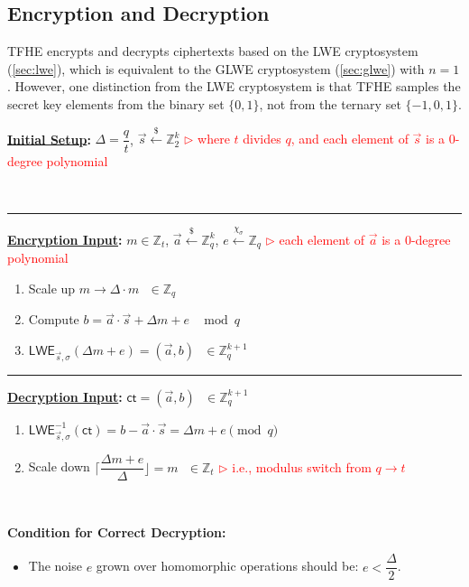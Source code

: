\clearpage

\subsection{Encryption and Decryption}
\label{subsec:tfhe-enc-dec}

TFHE encrypts and decrypts ciphertexts based on the LWE cryptosystem (\autoref{sec:lwe}), which is equivalent to the GLWE cryptosystem (\autoref{sec:glwe}) with $n = 1$. However, one distinction from the LWE cryptosystem is that TFHE samples the secret key elements from the binary set $\{0, 1\}$, not from the ternary set $\{-1, 0, 1\}$.


\begin{tcolorbox}[title={\textbf{\tboxlabel{\ref*{subsec:tfhe-enc-dec}} TFHE Encryption and Decryption}}]
\textbf{\underline{Initial Setup}:} $\Delta = \dfrac{q}{t}$, $\vec{s} \xleftarrow{\$} \mathbb{Z}_2^k$  \textcolor{red}{ $\rhd$ where $t$ divides $q$, and each element of $\vec{s}$ is a 0-degree polynomial}

$ $

\par\noindent\rule{\textwidth}{0.4pt}

\textbf{\underline{Encryption Input}:} $m \in \mathbb{Z}_t$, $\vec{a} \xleftarrow{\$} \mathbb{Z}_q^k$, $e \xleftarrow{\chi_\sigma} \mathbb{Z}_q$ \textcolor{red}{ $\rhd$ each element of $\vec{a}$ is a 0-degree polynomial}
\begin{enumerate}
\item Scale up $m \longrightarrow \Delta \cdot m \text{ } \in \mathbb{Z}_q$

\item Compute $b = \vec{a} \cdot \vec{s} + \Delta  m + e \text{ } \bmod q$
\item $\textsf{LWE}_{\vec{s},\sigma}(\Delta  m + e) = (\vec{a}, b) \text{ } \in \mathbb{Z}_q^{k + 1}$ 
\end{enumerate}

\par\noindent\rule{\textwidth}{0.4pt}

\textbf{\underline{Decryption Input}:} $\textsf{ct} = (\vec{a}, b) \text{ } \in \mathbb{Z}_q^{k+1}$
\begin{enumerate}
\item $\textsf{LWE}^{-1}_{\vec{s},\sigma}(\textsf{ct}) = b - \vec{a}\cdot \vec{s} = \Delta  m + e  \pmod q$

\item Scale down $\Bigg\lceil\dfrac{ \Delta  m + e } {\Delta}\Bigg\rfloor = m \text{ } \in \mathbb{Z}_t$ \textcolor{red}{ $\rhd$ i.e., modulus switch from $q \rightarrow t$}
\end{enumerate}

$ $

\textbf{{Condition for Correct Decryption}:}
\begin{itemize}
\item The noise $e$ grown over homomorphic operations should be: $e < \dfrac{\Delta}{2}$. 
\end{itemize}

\end{tcolorbox}

